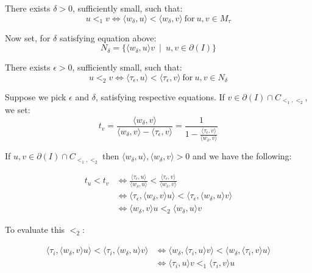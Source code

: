 \documentclass[12pt,a4paper]{report}
\begin{document}
There exists $\delta > 0$, sufficiently small, such that:
\begin{equation*}
    u <_{1} v \Longleftrightarrow \langle w_{\delta}, u \rangle < \langle w_{\delta}, v \rangle \: \text{for} \: u, v \in M_{\tau}
\end{equation*}

Now set, for $\delta$ satisfying equation above:
\begin{equation*}
    N_{\delta} = \{ \langle w_{\delta}, u \rangle v \: \mid \: u, v \in \partial (I) \}
\end{equation*}

There exists $\epsilon > 0$, sufficiently small, such that:
\begin{equation*}
    u <_{2} v \Longleftrightarrow \langle \tau_{\epsilon}, u \rangle < \langle \tau_{\epsilon}, v \rangle \: \text{for} \: u, v \in N_{\delta}
\end{equation*}

Suppose we pick $\epsilon$ and $\delta$, satisfying respective equations. If $v \in \partial (I) \cap C_{{<_{1}}, <_{2}}$, we set:
\begin{equation*}
    t_{v} = \frac{\langle w_{\delta}, v \rangle}{\langle w_{\delta}, v \rangle - \langle \tau_{\epsilon}, v \rangle} = \frac{1}{1 - \frac{\langle \tau_{\epsilon}, v \rangle} {\langle w_{\delta}, v \rangle }}
\end{equation*}

If $u, v \in \partial (I) \cap C_{{<_{1}}, <_{2}}$ then $\langle w_{\delta}, u \rangle, \langle w_{\delta}, v \rangle > 0$ and we have the following:


\begin{equation*}
\begin{split}
    t_{u} < t_{v} &  \Longleftrightarrow \frac{\langle \tau_{\epsilon}, u \rangle}{\langle w_{\delta}, u \rangle} < \frac{\langle \tau_{\epsilon}, v \rangle}{\langle w_{\delta}, v \rangle} \\ & \Longleftrightarrow  \langle \tau_{\epsilon}, \langle w_{\delta}, v \rangle u \rangle < \langle \tau_{\epsilon}, \langle w_{\delta}, u \rangle v \rangle \\ & \Longleftrightarrow  \langle w_{\delta}, v \rangle u <_{2} \langle w_{\delta}, u \rangle v
\end{split}
\end{equation*}

To evaluate this $<_{2}$:

\begin{equation*}
\begin{split}
     \langle \tau_{i}, \langle  w_{\delta}, v \rangle u \rangle < \langle \tau_{i}, \langle w_{\delta}, u \rangle v \rangle & \Longleftrightarrow \langle w_{\delta}, \langle \tau_{i}, u \rangle v \rangle < \langle w_{\delta}, \langle \tau_{i}, v \rangle u \rangle \\ & \Longleftrightarrow \langle \tau_{i}, u \rangle v <_{1} \langle \tau_{i}, v \rangle u
\end{split}
\end{equation*}
\end{document}
